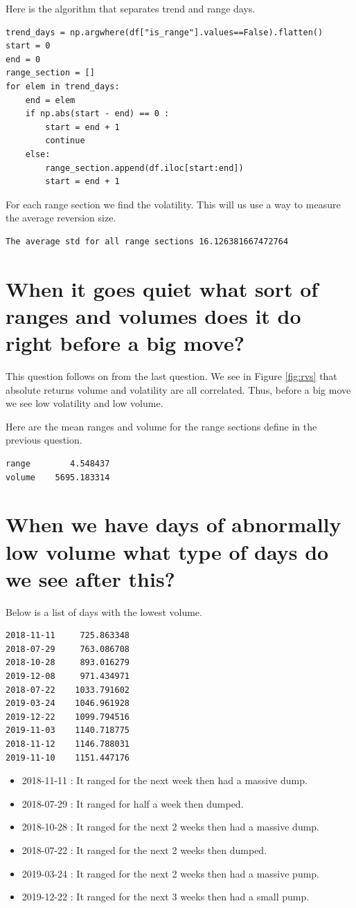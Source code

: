 Here is the algorithm that separates trend and range days.

\begin{verbatim}
trend_days = np.argwhere(df["is_range"].values==False).flatten()
start = 0
end = 0
range_section = []
for elem in trend_days:
    end = elem
    if np.abs(start - end) == 0 :
        start = end + 1
        continue
    else:
        range_section.append(df.iloc[start:end])
        start = end + 1
\end{verbatim}
For each range section we find the volatility. This will us use a way to measure the average reversion size.

\begin{verbatim}
The average std for all range sections 16.126381667472764
\end{verbatim}


\section{ When it goes quiet what sort of ranges and volumes does it do right before a big move?}
This question follows on from the last question. We see in Figure \ref{fig:rvs} that absolute returns volume and volatility are all correlated. Thus, before a big move we see low volatility and low volume. 

Here are the mean ranges and volume for the range sections define in the previous question.
\begin{verbatim}
range        4.548437
volume    5695.183314
\end{verbatim}
\section{ When we have days of abnormally low volume what type of days do we see after this?}
Below is a list of days with the lowest volume.
\begin{verbatim}
2018-11-11     725.863348
2018-07-29     763.086708
2018-10-28     893.016279
2019-12-08     971.434971
2018-07-22    1033.791602
2019-03-24    1046.961928
2019-12-22    1099.794516
2019-11-03    1140.718775
2018-11-12    1146.788031
2019-11-10    1151.447176
\end{verbatim}
\begin{itemize}
\item 2018-11-11 : It ranged for the next week then had a massive dump.
\item 2018-07-29 : It ranged for half a week then dumped.
\item 2018-10-28 : It ranged for the next 2 weeks then had a massive dump.
\item 2018-07-22 : It ranged for the next 2 weeks then dumped.
\item 2019-03-24 : It ranged for the next 2 weeks then had a massive pump.
\item 2019-12-22 : It ranged for the next 3 weeks then had a small pump.
\end{itemize}

